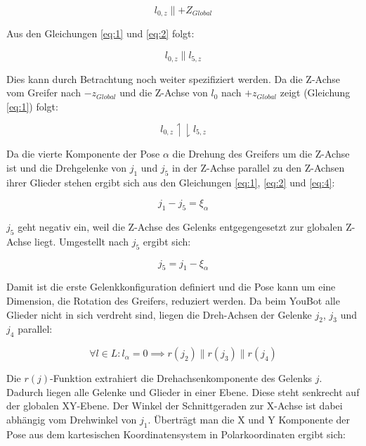 \begin{equation}
l_{0,z} \parallel +Z_{Global}
\label{eq:2}
\end{equation}

Aus den Gleichungen \ref{eq:1} und \ref{eq:2} folgt:

\begin{equation}
l_{0,z} \parallel l_{5,z}
\label{eq:3}
\end{equation}

Dies kann durch Betrachtung noch weiter spezifiziert werden. Da die Z-Achse vom Greifer nach $-z_{Global}$ und die Z-Achse von $l_0$ nach $+z_{Global}$  zeigt (Gleichung \ref{eq:1}) folgt:

\begin{equation}
l_{0,z} \upharpoonleft \downharpoonright l_{5,z}
\label{eq:4}
\end{equation}

Da die vierte Komponente der Pose $\alpha$ die Drehung des Greifers um die Z-Achse ist und die Drehgelenke von $j_1$ und $j_5$ in der Z-Achse parallel zu den Z-Achsen ihrer Glieder stehen ergibt sich aus den Gleichungen \ref{eq:1}, \ref{eq:2} und \ref{eq:4}:

\begin{equation}
j_1 - j_5 = \xi_{\alpha}
\end{equation}

$j_5$ geht negativ ein, weil die Z-Achse des Gelenks entgegengesetzt zur globalen Z-Achse liegt. Umgestellt nach $j_5$ ergibt sich:

\begin{equation}
j_5 = j_1 - \xi_{\alpha}
\end{equation}

Damit ist die erste Gelenkkonfiguration definiert und die Pose kann um eine Dimension, die Rotation des Greifers, reduziert werden. Da beim YouBot alle Glieder nicht in sich verdreht sind, liegen die Dreh-Achsen der Gelenke $j_2$, $j_3$ und $j_4$ parallel:

\begin{equation}
	\forall l  \in L: l_{\alpha} = 0 \implies r(j_{2}) \parallel r(j_{3}) \parallel r(j_{4}) 
\end{equation}

Die $r(j)$-Funktion extrahiert die Drehachsenkomponente des Gelenks $j$. Dadurch liegen alle Gelenke und Glieder in einer Ebene. Diese steht senkrecht auf der globalen XY-Ebene. Der Winkel der Schnittgeraden zur X-Achse ist dabei abhängig vom Drehwinkel von $j_1$. Überträgt man die X und Y Komponente der Pose aus dem kartesischen Koordinatensystem in Polarkoordinaten ergibt sich:

